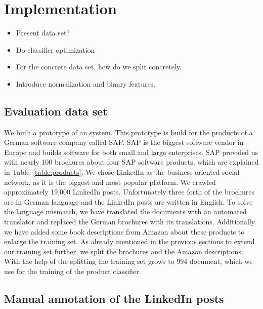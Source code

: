 
\section{Implementation}
\label{sec:implementation}

\begin{itemize}
	\item Present data set?
	\item Do classifier optimization
	\item For the concrete data set, how do we split concretely.
	\item Introduce normalization and binary features.
\end{itemize}

\subsection{Evaluation data set}
\label{sub:initial_data_set}
We built a prototype of an \nto system.
This prototype is build for the products of a German software company called SAP.
SAP is the biggest software vendor in Europe and builds software for both small and large enterprises.
SAP provided us with nearly 100 brochures about four SAP software products, which are explained in Table~\ref{table:products}.
We chose LinkedIn as the business-oriented social network, as it is the biggest and most popular platform.
We crawled approximately 19,000 LinkedIn posts.
Unfortunately three forth of the brochures are in German language and the LinkedIn posts are written in English.
To solve the language mismatch, we have translated the documents with an automated translator and replaced the German brochures with its translations.
Additionally we have added some book descriptions from Amazon about these products to enlarge the training set.
As already mentioned in the previous sections to extend our training set further, we split the brochures and the Amazon descriptions.
With the help of the splitting the training set grows to 994 document, which we use for the training of the product classifier.

\subsection{Manual annotation of the LinkedIn posts}
\label{sub:manual_annotation_of_the_linkedin_posts}

